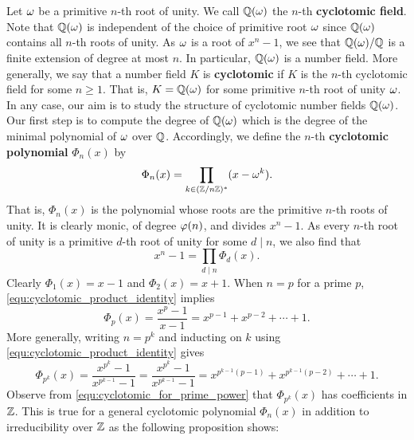   \section{}
    Let $\omega$ be a primitive $n$-th root of unity. We call $\mathbb{Q}(\omega)$ the $n$-th \textbf{cyclotomic field}. Note that $\mathbb{Q}(\omega)$ is independent of the choice of primitive root $\omega$ since $\mathbb{Q}(\omega)$ contains all $n$-th roots of unity. As $\omega$ is a root of $x^{n}-1$, we see that $\mathbb{Q}(\omega)/\mathbb{Q}$ is a finite extension of degree at most $n$. In particular, $\mathbb{Q}(\omega)$ is a number field. More generally, we say that a number field $K$ is \textbf{cyclotomic} if $K$ is the $n$-th cyclotomic field for some $n \ge 1$. That is, $K = \mathbb{Q}(\omega)$ for some primitive $n$-th root of unity $\omega$. In any case, our aim is to study the structure of cyclotomic number fields $\mathbb{Q}(\omega)$. Our first step is to compute the degree of $\mathbb{Q}(\omega)$ which is the degree of the minimal polynomial of $\omega$ over $\mathbb{Q}$. Accordingly, we define the $n$-th \textbf{cyclotomic polynomial} $\Phi_{n}(x)$ by
    \[
      \Phi_{n}(x) = \prod_{k \in (\mathbb{Z}/n\mathbb{Z})^{\ast}}(x-\omega^{k}).
    \]
    That is, $\Phi_{n}(x)$ is the polynomial whose roots are the primitive $n$-th roots of unity. It is clearly monic, of degree $\varphi(n)$, and divides $x^{n}-1$. As every $n$-th root of unity is a primitive $d$-th root of unity for some $d \mid n$, we also find that
    \begin{equation}\label{equ:cyclotomic_product_identity}
      x^{n}-1 = \prod_{d \mid n}\Phi_{d}(x).
    \end{equation}
    Clearly $\Phi_{1}(x) = x-1$ and $\Phi_{2}(x) = x+1$. When $n = p$ for a prime $p$, \cref{equ:cyclotomic_product_identity} implies
    \[
      \Phi_{p}(x) = \frac{x^{p}-1}{x-1} = x^{p-1}+x^{p-2}+\cdots+1.
    \]
    More generally, writing $n = p^{k}$ and inducting on $k$ using \cref{equ:cyclotomic_product_identity} gives
    \begin{equation}\label{equ:cyclotomic_for_prime_power}
      \Phi_{p^{k}}(x) = \frac{x^{p^{k}}-1}{x^{p^{k-1}}-1} = \frac{x^{p^{k}}-1}{x^{p^{k-1}}-1} = x^{p^{k-1}(p-1)}+x^{p^{k-1}(p-2)}+\cdots+1.
    \end{equation}
    Observe from \cref{equ:cyclotomic_for_prime_power} that $\Phi_{p^{k}}(x)$ has coefficients in $\mathbb{Z}$. This is true for a general cyclotomic polynomial $\Phi_{n}(x)$ in addition to irreducibility over $\mathbb{Z}$ as the following proposition shows:

